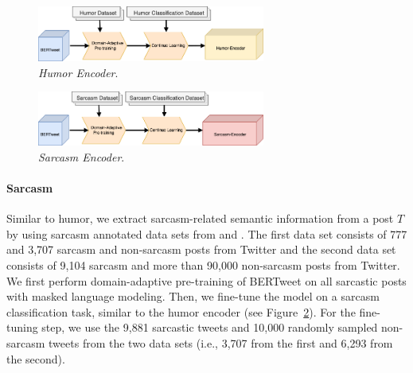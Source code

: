 \documentclass[11pt]{article}
\begin{document}
\begin{figure}[t!]
\centering\includegraphics[width=7.5cm]{humor_encoder.png}
\caption{\textit{Humor Encoder}.}
\label{fig:humorEncoder}
\end{figure}

\begin{figure}[t!]
\centering\includegraphics[width=7.5cm]{sarcasm_encoder.png}
\caption{\textit{Sarcasm Encoder}.}
\label{fig:sarcasmEncoder}
\end{figure}



\paragraph{Sarcasm} 
Similar to humor, we extract sarcasm-related semantic information from a post $T$ by using sarcasm annotated data sets from \citet{oprea-magdy-2020-isarcasm} and \citet{Rajadesingan2015SarcasmDO}. The first data set consists of 777 and 3,707 sarcasm and non-sarcasm posts from Twitter and the second data set consists of 9,104 sarcasm and more than 90,000 non-sarcasm posts from Twitter. We first perform domain-adaptive pre-training of BERTweet on all sarcastic posts with masked language modeling. Then, we fine-tune the model on a sarcasm classification task, similar to the humor encoder (see Figure~\ref{fig:sarcasmEncoder}). For the fine-tuning step, we use the 9,881 sarcastic tweets and 10,000 randomly sampled non-sarcasm tweets from the two data sets (i.e., 3,707 from the first and 6,293 from the second).


\end{document}
